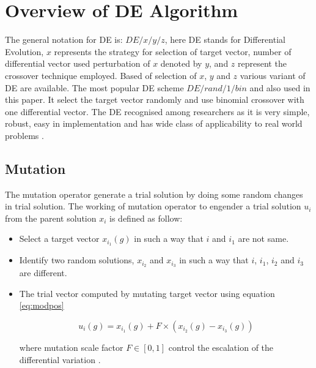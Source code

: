 \documentclass{svproc}
\begin{document}
\section{Overview of DE Algorithm}\label{sec:de}
The general notation for DE is: $DE/x/y/z$, here DE stands for Differential Evolution, $x$ represents the strategy for selection of target vector, number of differential vector used perturbation of $x$ denoted by $y$, and $z$ represent the crossover technique employed. Based of selection of $x$, $y$ and $z$ \cite{price1996differential} various variant of DE are available. The most popular DE scheme $DE/rand/1/bin$ and also used in this paper. It select the target vector randomly and use binomial crossover with one differential vector.  The DE recognised among researchers as it is very simple, robust, easy in implementation and has wide class of applicability to real world problems \cite{sharma2019review}.

\subsection{Mutation}

The mutation operator generate a trial solution by doing some random changes in trial solution. The working of mutation operator to engender a trial solution $u_i$ from the parent solution $x_i$ is defined as follow:
\begin{itemize}
\item Select a target vector $x_{i_1}(g)$ in such a way that $i$ and $i_1$ are not same.
\item Identify two random solutions, $x_{i_2}$ and $x_{i_3}$ in such a way that $i$, $i_1$, $ i_2$ and $i_3$ are different.
\item The trial vector computed by mutating target vector using equation \ref{eq:modpos}

\begin{equation}\label{eq:modpos}
u_i(g)= x_{i_1}(g)+ F\times (x_{i_2}(g)-x_{i_3}(g))
\end{equation}

where mutation scale factor $F \in [0, 1]$ control the escalation of the differential variation \cite{engelbrecht2007computational}.
\end{itemize}
\end{document}
